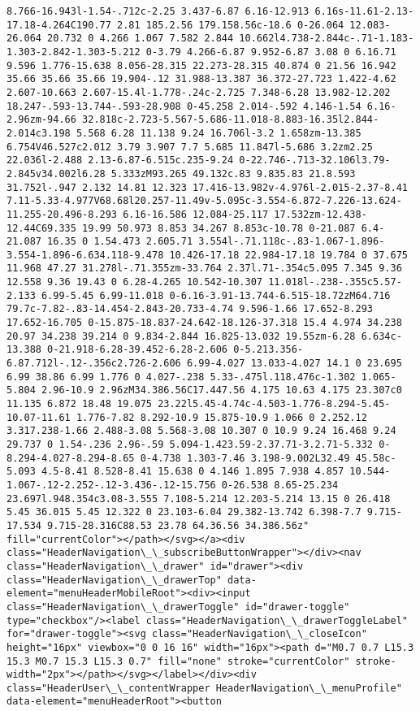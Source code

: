 \documentclass[11pt]{article}
\begin{document}
\begin{Verbatim}[commandchars=\\\{\}]
8.766-16.943l-1.54-.712c-2.25 3.437-6.87 6.16-12.913 6.16s-11.61-2.13-17.18-4.264C190.77 2.81 185.2.56 179.158.56c-18.6 0-26.064 12.083-26.064 20.732 0 4.266 1.067 7.582 2.844 10.662l4.738-2.844c-.71-1.183-1.303-2.842-1.303-5.212 0-3.79 4.266-6.87 9.952-6.87 3.08 0 6.16.71 9.596 1.776-15.638 8.056-28.315 22.273-28.315 40.874 0 21.56 16.942 35.66 35.66 35.66 19.904-.12 31.988-13.387 36.372-27.723 1.422-4.62 2.607-10.663 2.607-15.4l-1.778-.24c-2.725 7.348-6.28 13.982-12.202 18.247-.593-13.744-.593-28.908 0-45.258 2.014-.592 4.146-1.54 6.16-2.96zm-94.66 32.818c-2.723-5.567-5.686-11.018-8.883-16.35l2.844-2.014c3.198 5.568 6.28 11.138 9.24 16.706l-3.2 1.658zm-13.385 6.754V46.527c2.012 3.79 3.907 7.7 5.685 11.847l-5.686 3.2zm2.25 22.036l-2.488 2.13-6.87-6.515c.235-9.24 0-22.746-.713-32.106l3.79-2.845v34.002l6.28 5.333zM93.265 49.132c.83 9.835.83 21.8.593 31.752l-.947 2.132 14.81 12.323 17.416-13.982v-4.976l-2.015-2.37-8.41 7.11-5.33-4.977V68.68l20.257-11.49v-5.095c-3.554-6.872-7.226-13.624-11.255-20.496-8.293 6.16-16.586 12.084-25.117 17.532zm-12.438-12.44C69.335 19.99 50.973 8.853 34.267 8.853c-10.78 0-21.087 6.4-21.087 16.35 0 1.54.473 2.605.71 3.554l-.71.118c-.83-1.067-1.896-3.554-1.896-6.634.118-9.478 10.426-17.18 22.984-17.18 19.784 0 37.675 11.968 47.27 31.278l-.71.355zm-33.764 2.37l.71-.354c5.095 7.345 9.36 12.558 9.36 19.43 0 6.28-4.265 10.542-10.307 11.018l-.238-.355c5.57-2.133 6.99-5.45 6.99-11.018 0-6.16-3.91-13.744-6.515-18.72zM64.716 79.7c-7.82-.83-14.454-2.843-20.733-4.74 9.596-1.66 17.652-8.293 17.652-16.705 0-15.875-18.837-24.642-18.126-37.318 15.4 4.974 34.238 20.97 34.238 39.214 0 9.834-2.844 16.825-13.032 19.55zm-6.28 6.634c-13.388 0-21.918-6.28-39.452-6.28-2.606 0-5.213.356-6.87.712l-.12-.356c2.726-2.606 6.99-4.027 13.033-4.027 14.1 0 23.695 6.99 38.86 6.99 1.776 0 4.027-.238 5.33-.475l.118.476c-1.302 1.065-5.804 2.96-10.9 2.96zM34.386.56C17.447.56 4.175 10.63 4.175 23.307c0 11.135 6.872 18.48 19.075 23.22l5.45-4.74c-4.503-1.776-8.294-5.45-10.07-11.61 1.776-7.82 8.292-10.9 15.875-10.9 1.066 0 2.252.12 3.317.238-1.66 2.488-3.08 5.568-3.08 10.307 0 10.9 9.24 16.468 9.24 29.737 0 1.54-.236 2.96-.59 5.094-1.423.59-2.37.71-3.2.71-5.332 0-8.294-4.027-8.294-8.65 0-4.738 1.303-7.46 3.198-9.002L32.49 45.58c-5.093 4.5-8.41 8.528-8.41 15.638 0 4.146 1.895 7.938 4.857 10.544-1.067-.12-2.252-.12-3.436-.12-15.756 0-26.538 8.65-25.234 23.697l.948.354c3.08-3.555 7.108-5.214 12.203-5.214 13.15 0 26.418 5.45 36.015 5.45 12.322 0 23.103-6.04 29.382-13.742 6.398-7.7 9.715-17.534 9.715-28.316C88.53 23.78 64.36.56 34.386.56z" fill="currentColor"></path></svg></a><div class="HeaderNavigation\_\_subscribeButtonWrapper"></div><nav class="HeaderNavigation\_\_drawer" id="drawer"><div class="HeaderNavigation\_\_drawerTop" data-element="menuHeaderMobileRoot"><div><input class="HeaderNavigation\_\_drawerToggle" id="drawer-toggle" type="checkbox"/><label class="HeaderNavigation\_\_drawerToggleLabel" for="drawer-toggle"><svg class="HeaderNavigation\_\_closeIcon" height="16px" viewbox="0 0 16 16" width="16px"><path d="M0.7 0.7 L15.3 15.3 M0.7 15.3 L15.3 0.7" fill="none" stroke="currentColor" stroke-width="2px"></path></svg></label></div><div class="HeaderUser\_\_contentWrapper HeaderNavigation\_\_menuProfile" data-element="menuHeaderRoot"><button 
\end{Verbatim}
\end{document}
